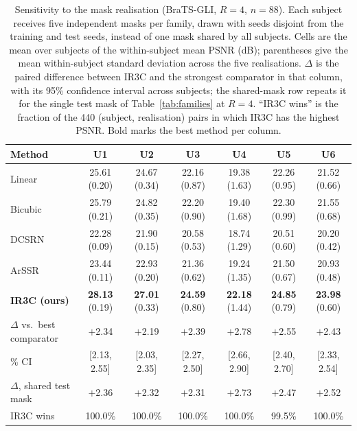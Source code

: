 \begin{table}[pos=t]
\caption{Sensitivity to the mask realisation (BraTS-GLI, $R=4$, $n=88$). Each subject receives five independent masks per family, drawn with seeds disjoint from the training and test seeds, instead of one mask shared by all subjects. Cells are the mean over subjects of the within-subject mean PSNR (dB); parentheses give the mean within-subject standard deviation across the five realisations. $\Delta$ is the paired difference between IR3C and the strongest comparator in that column, with its 95\% confidence interval across subjects; the shared-mask row repeats it for the single test mask of Table~\ref{tab:families} at $R=4$. ``IR3C wins'' is the fraction of the 440 (subject, realisation) pairs in which IR3C has the highest PSNR. Bold marks the best method per column.}
\label{tab:realisations}
\small
\begin{tabular*}{\textwidth}{@{\extracolsep{\fill}}lcccccc@{}}
\toprule
Method & U1 & U2 & U3 & U4 & U5 & U6 \\
\midrule
Linear & 25.61 (0.20) & 24.67 (0.34) & 22.16 (0.87) & 19.38 (1.63) & 22.26 (0.95) & 21.52 (0.66) \\
Bicubic & 25.79 (0.21) & 24.82 (0.35) & 22.20 (0.90) & 19.40 (1.68) & 22.30 (0.99) & 21.55 (0.68) \\
DCSRN & 22.28 (0.09) & 21.90 (0.15) & 20.58 (0.53) & 18.74 (1.29) & 20.51 (0.60) & 20.20 (0.42) \\
ArSSR & 23.44 (0.11) & 22.93 (0.20) & 21.36 (0.62) & 19.24 (1.35) & 21.50 (0.67) & 20.93 (0.48) \\
\textbf{IR3C (ours)} & \textbf{28.13} (0.19) & \textbf{27.01} (0.33) & \textbf{24.59} (0.80) & \textbf{22.18} (1.44) & \textbf{24.85} (0.79) & \textbf{23.98} (0.60) \\
\midrule
$\Delta$ vs.\ best comparator & $+$2.34 & $+$2.19 & $+$2.39 & $+$2.78 & $+$2.55 & $+$2.43 \\
\quad 95\% CI & [2.13, 2.55] & [2.03, 2.35] & [2.27, 2.50] & [2.66, 2.90] & [2.40, 2.70] & [2.33, 2.54] \\
$\Delta$, shared test mask & $+$2.36 & $+$2.32 & $+$2.31 & $+$2.73 & $+$2.47 & $+$2.52 \\
IR3C wins & 100.0\% & 100.0\% & 100.0\% & 100.0\% & 99.5\% & 100.0\% \\
\bottomrule
\end{tabular*}
\end{table}
